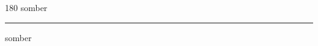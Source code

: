 
\begin{frame}
\begin{center}
\begin{turn}{180}
{\fontsize{2.5cm}{1em}\selectfont somber}
\end{turn}
\vspace{1em}\par  
\hrule
\vspace{1em}\par  
{\fontsize{2.5cm}{1em}\selectfont somber}
\end{center}
\end{frame}
